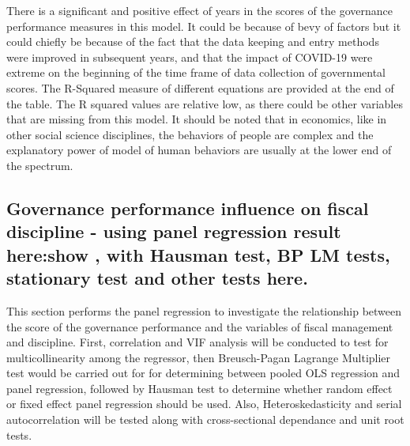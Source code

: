 There is a significant and positive effect of years in the scores of the governance performance measures in this model. It could be because of bevy of factors but it could chiefly be because of the fact that the data keeping and entry methods were improved in subsequent years, and that the impact of COVID-19 were extreme on the beginning of the time frame of data collection of governmental scores. The R-Squared measure of different equations are provided at the end of the table. The R squared values are relative low, as there could be other variables that are missing from this model.  It should be noted that in economics, like in other social science disciplines, the behaviors of people are complex and the explanatory power of model of human behaviors are usually at the lower end of the spectrum.\\
\subsection{Governance performance influence on fiscal discipline - using panel regression result here:show  , with Hausman test, BP LM tests, stationary test and other tests here.}
This section performs the panel regression to investigate the relationship between the score of the governance performance and the variables of fiscal management and discipline. First, correlation and VIF analysis will be conducted to test for multicollinearity among the regressor, then Breusch-Pagan Lagrange Multiplier test would be carried out for for determining between pooled OLS regression and panel regression, followed by Hausman test to determine whether random effect or fixed effect panel regression should be used. Also, Heteroskedasticity and serial autocorrelation will be tested along with cross-sectional dependance and unit root tests. 

